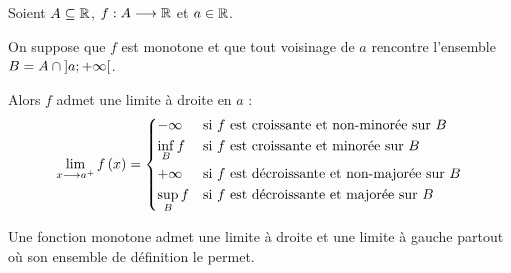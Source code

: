\begin{dem}
\end{dem}

\begin{theo}
Soient \(A\subseteq\mathbb{R}\), \(f:A\longrightarrow\mathbb{R}\) et \(a\in\mathbb{R}\).

On suppose que \(f\) est monotone et que tout voisinage de \(a\) rencontre l'ensemble \(B=A\cap\left]a;+\infty\right[\).

Alors \(f\) admet une limite à droite en \(a\) : \[\lim_{x\longrightarrow a^+}f\left(x\right)=\begin{dcases}
-\infty &\text{si \(f\) est croissante et non-minorée sur \(B\)} \\
\inf_Bf &\text{si \(f\) est croissante et minorée sur \(B\)} \\
+\infty &\text{si \(f\) est décroissante et non-majorée sur \(B\)} \\
\sup_Bf &\text{si \(f\) est décroissante et majorée sur \(B\)}
\end{dcases}\]
\end{theo}

\begin{bilan}
Une fonction monotone admet une limite à droite et une limite à gauche partout où son ensemble de définition le permet.
\end{bilan}

